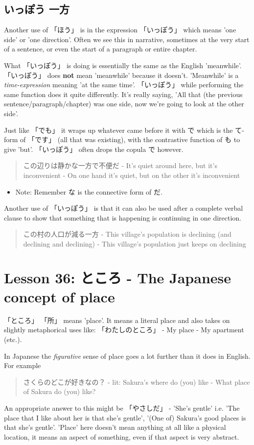 \documentclass[11pt]{article}
\begin{document}
\subsection{いっぽう 一方}
\label{sec:orgc92efb4}
Another use of 「ほう」 is in the expression 「いっぽう」 which means 'one side' or 'one direction'. Often we see this in narrative, sometimes at the very start of a sentence, or even the start of a paragraph or entire chapter.

What 「いっぽう」 is doing is essentially the same as the English 'meanwhile'. 「いっぽう」 does \textbf{not} mean 'meanwhile' because it doesn't. 'Meanwhile' is a \emph{time-expression} meaning 'at the same time'. 「いっぽう」 while performing the same function does it quite differently. It's really saying, 'All that (the previous sentence/paragraph/chapter) was one side, now we're going to look at the other side'.

Just like 「でも」 it wraps up whatever came before it with で which is the て-form of 「です」 (all that was existing), with the contrastive function of も to give 'but'. 「いっぽう」 often drops the copula で however.

\begin{quote}
この辺りは静かな一方で不便だ - It's quiet around here, but it's inconvenient - On one hand it's quiet, but on the other it's inconvenient
\end{quote}
\begin{itemize}
\item Note: Remember な is the connective form of だ.
\end{itemize}

Another use of 「いっぽう」 is that it can also be used after a complete verbal clause to show that something that is happening is continuing in one direction.
\begin{quote}
この村の人口が減る一方 - This village's population is declining (and declining and declining) - This village's population just keeps on declining
\end{quote}

\section{Lesson 36: ところ - The Japanese concept of place}
\label{sec:org3519756}
「ところ」 「所」 means 'place'. It means a literal place and also takes on slightly metaphorical uses like: 「わたしのところ」 - My place - My apartment (etc.).

In Japanese the \emph{figurative} sense of place goes a lot further than it does in English. For example
\begin{quote}
さくらのどこが好きなの？ - lit: Sakura's where do (you) like - What place of Sakura do (you) like?
\end{quote}
An appropriate answer to this might be 「やさしだ」 - 'She's gentle' i.e. 'The place that I like about her is that she's gentle', '(One of) Sakura's good places is that she's gentle'. 'Place' here doesn't mean anything at all like a physical location, it means an aspect of something, even if that aspect is very abstract.
\end{document}
